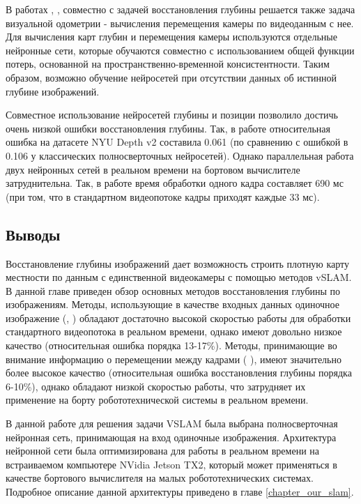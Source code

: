\documentclass{mipt-thesis-ms}
\begin{document}
	В работах \cite{zhou2017unsupervised}, \cite{yang2020d3vo}, \cite{teed2018deepv2d} совместно с задачей восстановления глубины решается также задача визуальной одометрии - вычисления перемещения камеры по видеоданным с нее. Для вычисления карт глубин и перемещения камеры используются отдельные нейронные сети, которые обучаются совместно с использованием общей функции потерь, основанной на пространственно-временной консистентности. Таким образом, возможно обучение нейросетей при отсутствии данных об истинной глубине изображений.
	
	Совместное использование нейросетей глубины и позиции позволило достичь очень низкой ошибки восстановления глубины. Так, в работе \cite{teed2018deepv2d} относительная ошибка на датасете NYU Depth v2 \cite{silberman2012indoor} составила 0.061 (по сравнению с ошибкой в 0.106 у классических полносверточных нейросетей). Однако параллельная работа двух нейронных сетей в реальном времени на бортовом вычислителе затруднительна. Так, в работе \cite{teed2018deepv2d} время обработки одного кадра составляет 690 мс (при том, что в стандартном видеопотоке кадры приходят каждые 33 мс).
	
	\subsection{Выводы}
	
	Восстановление глубины изображений дает возможность строить плотную карту местности по данным с единственной видеокамеры с помощью методов vSLAM. В данной главе приведен обзор основных методов восстановления глубины по изображениям. Методы, использующие в качестве входных данных одиночное изображение (\cite{laina2016deeper}, \cite{wofk2019fastdepth}) обладают достаточно высокой скоростью работы для обработки стандартного видеопотока в реальном времени, однако имеют довольно низкое качество (относительная ошибка порядка 13-17\%). Методы, принимающие во внимание информацию о перемещении между кадрами (\cite{zhang2019exploiting} \cite{luo2020consistent} \cite{teed2018deepv2d}), имеют значительно более высокое качество (относительная ошибка восстановления глубины порядка 6-10\%), однако обладают низкой скоростью работы, что затрудняет их применение на борту робототехнической системы в реальном времени.
	
	В данной работе для решения задачи VSLAM была выбрана полносверточная нейронная сеть, принимающая на вход одиночные изображения. Архитектура нейронной сети была оптимизирована для работы в реальном времени на встраиваемом компьютере NVidia Jetson TX2, который может применяться в качестве бортового вычислителя на малых робототехнических системах. Подробное описание данной архитектуры приведено в главе \ref{chapter_our_slam}.
	
\end{document}
